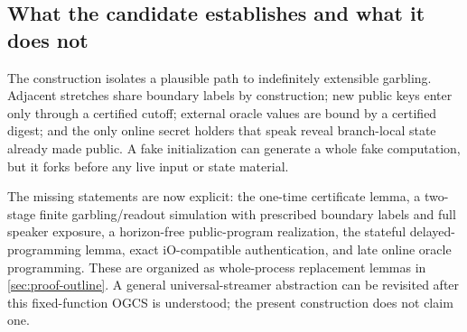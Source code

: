 \subsection{What the candidate establishes and what it does not}

The construction isolates a plausible path to indefinitely extensible
garbling.  Adjacent stretches share boundary labels by construction; new
public keys enter only through a certified cutoff; external oracle values are
bound by a certified digest; and the only online secret holders that speak
reveal branch-local state already made public.  A fake initialization can
generate a whole fake computation, but it forks before any live input or
state material.

The missing statements are now explicit: the one-time certificate lemma, a
two-stage finite garbling/readout simulation with prescribed boundary labels
and full speaker exposure, a horizon-free public-program realization, the
stateful delayed-programming lemma, exact iO-compatible authentication, and
late online oracle programming.  These are organized as whole-process
replacement lemmas in \cref{sec:proof-outline}.  A general universal-streamer
abstraction can be revisited after this fixed-function OGCS is understood;
the present construction does not claim one.
